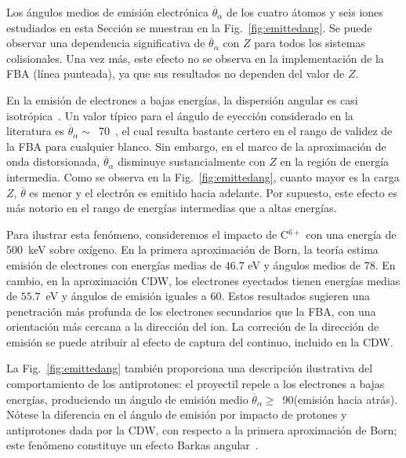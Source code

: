 Los ángulos medios de emisión electrónica $\overline{\theta}_{\alpha}$ 
de los cuatro átomos y seis iones estudiados en esta Sección se muestran 
en la Fig.~\ref{fig:emittedang}. Se puede observar una dependencia 
significativa de $\overline{\theta}_{\alpha}$ con $Z$ para todos los 
sistemas colisionales. Una vez más, este efecto no se observa en la 
implementación de la FBA (línea punteada), ya que sus resultados no 
dependen del valor de $Z$.

En la emisión de electrones a bajas energías, la dispersión angular es 
casi isotrópica~\cite{Rudd:92}. Un valor típico para el ángulo de 
eyección considerado en la literatura es 
$\overline{\theta}_{\alpha}\sim$~70\textdegree~\cite{Surdutovic:18}, el 
cual resulta bastante certero en el rango de validez de la FBA para 
cualquier blanco. Sin embargo, en el marco de la aproximación de onda 
distorsionada, $\overline{\theta}_{\alpha}$ disminuye sustancialmente 
con $Z$ en la región de energía intermedia. Como se observa en la 
Fig.~\ref{fig:emittedang}, cuanto mayor es la carga $Z$,
$\overline{\theta}$ es menor y el electrón es emitido hacia adelante. 
Por supuesto, este efecto es más notorio en el rango de energías 
intermedias que a altas energías.

Para ilustrar esta fenómeno, consideremos el impacto de C$^{6+}$ con una 
energía de 500~keV sobre oxígeno. En la primera aproximación de Born, la 
teoría estima emisión de electrones con energías medias de $46.7$ eV y 
ángulos medios de 78\textdegree. En cambio, en la aproximación CDW, los 
electrones eyectados tienen energías medias de $55.7$~eV y ángulos de 
emisión iguales a 60\textdegree. Estos resultados sugieren una 
penetración más profunda de los electrones secundarios que la FBA, con 
una orientación más cercana a la dirección del ion. La correción de la 
dirección de emisión se puede atribuir al efecto de captura del 
continuo, incluido en la CDW.

La Fig.~\ref{fig:emittedang} también proporciona una descripción 
ilustrativa del comportamiento de los antiprotones: el proyectil repele 
a los electrones a bajas energías, produciendo un ángulo de emisión 
medio $\overline{\theta}_{\alpha}\ge$~90\textdegree (emisión hacia 
atrás). Nótese la diferencia en el ángulo de emisión por impacto de 
protones y antiprotones dada por la CDW, con respecto a la primera 
aproximación de Born; este fenómeno constituye un efecto Barkas 
angular~\cite{Sigmud:03}.

